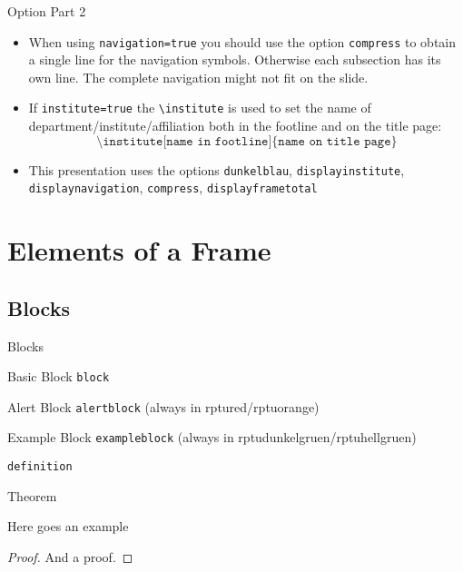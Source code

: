 \documentclass{beamer}
\begin{document}
\begin{frame}{Option Part 2}
\begin{itemize}
	\item When using \texttt{navigation=true} you should use the option \texttt{compress} to obtain a single line for the navigation symbols. Otherwise each subsection has its own line. The complete navigation might not fit on the slide.
	\item If \texttt{institute=true} the \texttt{\textbackslash institute} is used to set the name of department/institute/affiliation both in the footline and on the title page:	
	\begin{equation*}
		\texttt{\textbackslash institute[name in footline]\{name on title page\}}
	\end{equation*}  
	\item This presentation uses the options \texttt{dunkelblau},
		  \texttt{displayinstitute}, \texttt{displaynavigation},
		  \texttt{compress},
          \texttt{displayframetotal}
\end{itemize}
		
	\end{frame}


\section{Elements of a Frame}
\rptusectionpage
	
\subsection{Blocks}

\begin{frame}{Blocks}
	\begin{block}{Basic Block}
	\texttt{block}
	\end{block}
	\begin{alertblock}{Alert Block}
	\texttt{alertblock} (always in rptured/rptuorange)
	\end{alertblock}
\begin{exampleblock}{Example Block}
	\texttt{exampleblock}  (always in rptudunkelgruen/rptuhellgruen)
	\end{exampleblock}
\end{frame}

\begin{frame}
		\begin{definition}
		\texttt{definition}
	\end{definition}
		\begin{Theorem}
			Theorem
		\end{Theorem}
		\begin{Example}
			Here goes an example
		\end{Example}
		\begin{proof}
			And a proof.
		\end{proof}
\end{frame}
\end{document}
